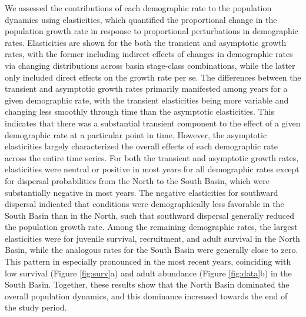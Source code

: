 \documentclass[11pt]{article}
\begin{document}
We assessed the contributions of each demographic rate to the population dynamics
using elasticities,
which quantified the proportional change in the population growth rate in
response to proportional perturbations in demographic rates.
Elasticities are shown for the both the transient and asymptotic growth rates,
with the former including indirect effects of changes in demographic rates
via changing distributions across basin \times stage-class combinations,
while the latter only included direct effects on the growth rate per se.
The differences between the transient and asymptotic growth rates primarily manifested
among years for a given demographic rate,
with the transient elasticities being more variable and changing less smoothly through time
than the asymptotic elasticities.
This indicates that there was a substantial transient component to the effect of a
given demographic rate at a particular point in time.
However, the asymptotic elasticities largely characterized the overall
effects of each demographic rate across the entire time series.
For both the transient and asymptotic growth rates,
elasticities were neutral or positive in most years for all demographic rates
except for dispersal probabilities from the North to the South Basin,
which were substantially negative in most years.
The negative elasticities for southward dispersal indicated that conditions were
demographically less favorable in the South Basin than in the North,
such that southward dispersal generally reduced the population growth rate.
Among the remaining demographic rates,
the largest elasticities were for juvenile survival, recruitment, and adult survival
in the North Basin, while the analogous rates for the South Basin were generally close to zero.
This pattern in especially pronounced in the most recent years,
coinciding with low survival (Figure \ref{fig:surv}a)
and adult abundance (Figure \ref{fig:data}b) in the South Basin.
Together, these results show that the North Basin dominated
the overall population dynamics,
and this dominance increased towards the end of the study period.





\end{document}
